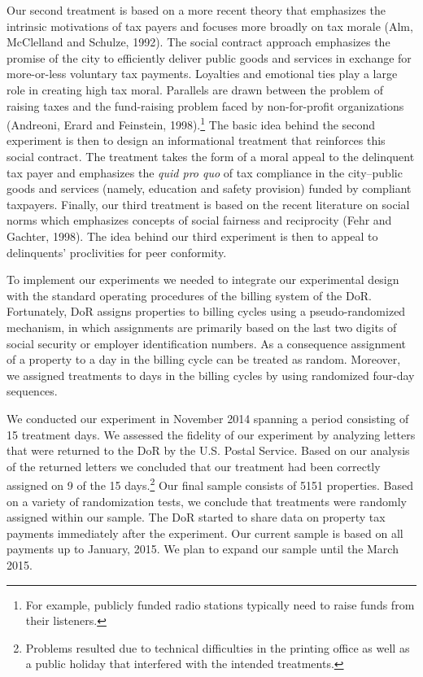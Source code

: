 \documentclass[12pt,titlepage]{article}
\begin{document}
Our second treatment is based on a more recent theory that emphasizes
the intrinsic motivations of tax payers and focuses more broadly on
tax morale (Alm, McClelland and Schulze, 1992). The social contract
approach emphasizes the promise of the city to efficiently deliver
public goods and services in exchange for more-or-less voluntary tax
payments.  Loyalties and emotional ties play a large role in creating
high tax moral. Parallels are drawn between the problem of raising
taxes and the fund-raising problem faced by non-for-profit
organizations (Andreoni, Erard and Feinstein, 1998).\footnote{For example, publicly funded radio stations
  typically need to raise funds from their listeners.} The basic idea
behind the second experiment is then to design an informational
treatment that reinforces this social contract. The treatment takes
the form of a moral appeal to the delinquent tax payer and emphasizes
the \textit{quid pro quo} of tax compliance in the city--public goods
and services (namely, education and safety provision) funded by
compliant taxpayers. Finally, our third treatment is based on the recent literature on
social norms which emphasizes concepts of social fairness and
reciprocity (Fehr and Gachter, 1998). The idea behind our third experiment is then to appeal to
delinquents' proclivities for peer conformity.

To implement our experiments we needed to integrate our experimental
design with the standard operating procedures of the billing system of
the DoR. Fortunately, DoR assigns properties to billing cycles
using a pseudo-randomized mechanism, in which assignments are primarily
based on the last two digits of social security or  employer
identification numbers.  As a consequence assignment of a property to a day in the billing cycle can be treated as random.
Moreover, we assigned treatments to
days in the billing cycles by using randomized four-day sequences.

We conducted our experiment in November 2014 spanning a period 
consisting of 15 treatment days.  We assessed the fidelity of our
experiment by analyzing letters that were returned to the DoR by the
U.S. Postal Service. Based on our analysis of the returned letters we
concluded that our treatment had been correctly assigned on 9 of the
15 days.\footnote{Problems resulted due to technical difficulties in
  the printing office as well as a public holiday that interfered with
  the intended treatments.}  Our final sample consists of 5151
properties. Based on a variety of randomization tests, we conclude
that treatments were randomly assigned within our sample. The DoR
started to share data on property tax payments immediately after the
experiment. Our current sample is based on all payments up to January,
2015. We plan to expand our sample until the March 2015.
\end{document}

